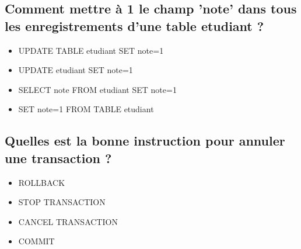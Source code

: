 \documentclass[11pt,a4paper]{article}
\begin{document}
\subsection{Comment mettre à 1 le champ 'note' dans tous les enregistrements d'une table etudiant ?}

\begin{itemize}
\item[\CaseCoche] UPDATE TABLE etudiant SET note=1 \\
\item[\CaseCoche] UPDATE etudiant SET note=1 \\
\item[\CaseCoche] SELECT note FROM etudiant SET note=1 \\
\item[\CaseCoche] SET note=1 FROM TABLE etudiant \\
\end{itemize}


\subsection{Quelles est la bonne instruction pour annuler une transaction ?}

\begin{itemize}
\item[\CaseCoche] ROLLBACK \\
\item[\CaseCoche] STOP TRANSACTION \\
\item[\CaseCoche] CANCEL TRANSACTION \\
\item[\CaseCoche] COMMIT \\
\end{itemize}
\end{document}
